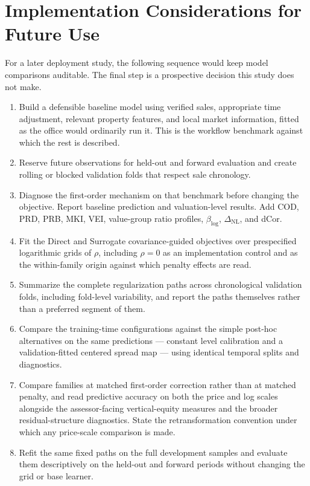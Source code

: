 \documentclass[10pt]{article}
\theoremstyle{definition}
\newcommand{\1}{\mathbf{1}}
\begin{document}
\section{Implementation Considerations for Future Use}
\label{sec:implementation_workflow}

For a later deployment study, the following sequence would keep model comparisons auditable. The final step is a prospective decision this study does not make.

\begin{enumerate}[leftmargin=7mm]
    \item Build a defensible baseline model using verified sales, appropriate time adjustment, relevant property features, and local market information, fitted as the office would ordinarily run it. This is the workflow benchmark against which the rest is described.
    \item Reserve future observations for held-out and forward evaluation and create rolling or blocked validation folds that respect sale chronology.
    \item Diagnose the first-order mechanism on that benchmark before changing the objective. Report baseline prediction and valuation-level results. Add COD, PRD, PRB, MKI, VEI, value-group ratio profiles, $\beta_{\log}$, $\Delta_{\mathrm{NL}}$, and dCor.
    \item Fit the Direct and Surrogate covariance-guided objectives over prespecified logarithmic grids of $\rho$, including $\rho=0$ as an implementation control and as the within-family origin against which penalty effects are read.
    \item Summarize the complete regularization paths across chronological validation folds, including fold-level variability, and report the paths themselves rather than a preferred segment of them.
    \item Compare the training-time configurations against the simple post-hoc alternatives on the same predictions --- constant level calibration and a validation-fitted centered spread map --- using identical temporal splits and diagnostics.
    \item Compare families at matched first-order correction rather than at matched penalty, and read predictive accuracy on both the price and log scales alongside the assessor-facing vertical-equity measures and the broader residual-structure diagnostics. State the retransformation convention under which any price-scale comparison is made.
    \item Refit the same fixed paths on the full development samples and evaluate them descriptively on the held-out and forward periods without changing the grid or base learner.

\end{enumerate}
\end{document}
